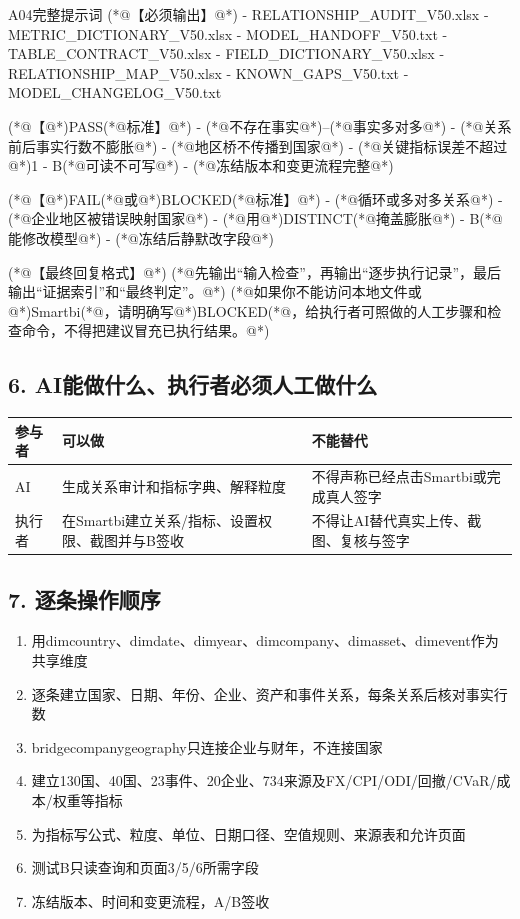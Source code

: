\documentclass[UTF8,openany,zihao=-4]{ctexbook}
\renewcommand{\_}{\textunderscore\allowbreak}
\begin{document}
\begin{PromptBox}{A04完整提示词}
(*@{\promptcjk 【必须输出】}@*)
- RELATIONSHIP_AUDIT_V50.xlsx
- METRIC_DICTIONARY_V50.xlsx
- MODEL_HANDOFF_V50.txt
- TABLE_CONTRACT_V50.xlsx
- FIELD_DICTIONARY_V50.xlsx
- RELATIONSHIP_MAP_V50.xlsx
- KNOWN_GAPS_V50.txt
- MODEL_CHANGELOG_V50.txt

(*@{\promptcjk 【}@*)PASS(*@{\promptcjk 标准】}@*)
- (*@{\promptcjk 不存在事实}@*)--(*@{\promptcjk 事实多对多}@*)
- (*@{\promptcjk 关系前后事实行数不膨胀}@*)
- (*@{\promptcjk 地区桥不传播到国家}@*)
- (*@{\promptcjk 关键指标误差不超过}@*)1%
- B(*@{\promptcjk 可读不可写}@*)
- (*@{\promptcjk 冻结版本和变更流程完整}@*)

(*@{\promptcjk 【}@*)FAIL(*@{\promptcjk 或}@*)BLOCKED(*@{\promptcjk 标准】}@*)
- (*@{\promptcjk 循环或多对多关系}@*)
- (*@{\promptcjk 企业地区被错误映射国家}@*)
- (*@{\promptcjk 用}@*)DISTINCT(*@{\promptcjk 掩盖膨胀}@*)
- B(*@{\promptcjk 能修改模型}@*)
- (*@{\promptcjk 冻结后静默改字段}@*)

(*@{\promptcjk 【最终回复格式】}@*)
(*@{\promptcjk 先输出“输入检查”，再输出“逐步执行记录”，最后输出“证据索引”和“最终判定”。}@*)
(*@{\promptcjk 如果你不能访问本地文件或}@*)Smartbi(*@{\promptcjk ，请明确写}@*)BLOCKED(*@{\promptcjk ，给执行者可照做的人工步骤和检查命令，不得把建议冒充已执行结果。}@*)
\end{PromptBox}

\subsection*{6. AI能做什么、执行者必须人工做什么}
\noindent\begin{tabularx}{\textwidth}{@{}p{}XX@{}}
\toprule
\textbf{参与者} & \textbf{可以做} & \textbf{不能替代} \\
\midrule
AI & 生成关系审计和指标字典、解释粒度 & 不得声称已经点击Smartbi或完成真人签字 \\
执行者 & 在Smartbi建立关系/指标、设置权限、截图并与B签收 & 不得让AI替代真实上传、截图、复核与签字 \\
\bottomrule
\end{tabularx}

\subsection*{7. 逐条操作顺序}
\begin{enumerate}
\item 用dim\_country、dim\_date、dim\_year、dim\_company、dim\_asset、dim\_event作为共享维度
\item 逐条建立国家、日期、年份、企业、资产和事件关系，每条关系后核对事实行数
\item bridge\_company\_geography只连接企业与财年，不连接国家
\item 建立130国、40国、23事件、20企业、734来源及FX/CPI/ODI/回撤/CVaR/成本/权重等指标
\item 为指标写公式、粒度、单位、日期口径、空值规则、来源表和允许页面
\item 测试B只读查询和页面3/5/6所需字段
\item 冻结版本、时间和变更流程，A/B签收
\end{enumerate}
\end{document}
